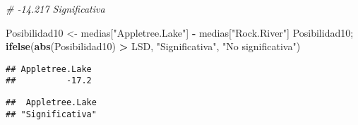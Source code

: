 \documentclass[
]{article}
\newenvironment{Shaded}{\begin{snugshade}}{\end{snugshade}}
\newcommand{\CommentTok}[1]{\textcolor[rgb]{0.56,0.35,0.01}{\textit{#1}}}
\newcommand{\FunctionTok}[1]{\textcolor[rgb]{0.13,0.29,0.53}{\textbf{#1}}}
\newcommand{\NormalTok}[1]{#1}
\newcommand{\OtherTok}[1]{\textcolor[rgb]{0.56,0.35,0.01}{#1}}
\newcommand{\SpecialCharTok}[1]{\textcolor[rgb]{0.81,0.36,0.00}{\textbf{#1}}}
\newcommand{\StringTok}[1]{\textcolor[rgb]{0.31,0.60,0.02}{#1}}
\begin{document}
\begin{Shaded}
\begin{Highlighting}[]
\CommentTok{\# {-}14.217 Significativa}

\NormalTok{Posibilidad10 }\OtherTok{\textless{}{-}}\NormalTok{ medias[}\StringTok{"Appletree.Lake"}\NormalTok{] }\SpecialCharTok{{-}}\NormalTok{ medias[}\StringTok{"Rock.River"}\NormalTok{]}
\NormalTok{Posibilidad10; }\FunctionTok{ifelse}\NormalTok{(}\FunctionTok{abs}\NormalTok{(Posibilidad10) }\SpecialCharTok{\textgreater{}}\NormalTok{ LSD, }\StringTok{"Significativa"}\NormalTok{, }\StringTok{"No significativa"}\NormalTok{)}
\end{Highlighting}
\end{Shaded}

\begin{verbatim}
## Appletree.Lake 
##          -17.2
\end{verbatim}

\begin{verbatim}
##  Appletree.Lake 
## "Significativa"
\end{verbatim}
\end{document}

